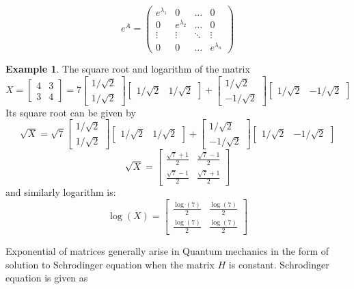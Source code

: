 \documentclass[12pt, oneside]{book}
\theoremstyle{definition}
\theoremstyle{definition}
\newtheorem{example}{Example}[section]
\theoremstyle{remark}
\begin{document}
\[ e^A = \begin{pmatrix} e^{\lambda_1} & 0 & \ldots & 0 \\ 0 & e^{\lambda_2} & \ldots & 0 \\ \vdots & \vdots & \ddots & \vdots \\ 0 & 0 & \ldots & e^{\lambda_n} \end{pmatrix} \]
\begin{example}
    The square root and logarithm of the matrix
    \[
    X=\begin{bmatrix} 4 & 3 \\ 3 & 4 \end{bmatrix}=7\begin{bmatrix} 1/\sqrt{2} \\ 1/\sqrt{2} \end{bmatrix} \begin{bmatrix} 1/\sqrt{2} & 1/\sqrt{2} \end{bmatrix} + \begin{bmatrix} 1/\sqrt{2} \\ -1/\sqrt{2} \end{bmatrix} \begin{bmatrix} 1/\sqrt{2} & -1/\sqrt{2} \end{bmatrix}
    \]
    Its square root can be given by
    \[
      \sqrt{X} = \sqrt{7}  \begin{bmatrix} 1/\sqrt{2} \\ 1/\sqrt{2} \end{bmatrix} \begin{bmatrix} 1/\sqrt{2} & 1/\sqrt{2} \end{bmatrix} + \begin{bmatrix} 1/\sqrt{2} \\ -1/\sqrt{2} \end{bmatrix} \begin{bmatrix} 1/\sqrt{2} & -1/\sqrt{2} \end{bmatrix}
    \]
    \[
    \sqrt{X}=\begin{bmatrix} \frac{\sqrt{7}+1}{2} & \frac{\sqrt{7}-1}{2} \\ \frac{\sqrt{7}-1}{2} & \frac{\sqrt{7}+1}{2} \end{bmatrix}
    \]
    and similarly logarithm is:
    \[
    \log(X)=\begin{bmatrix} \frac{\log(7)}{2} & \frac{\log(7)}{2} \\ \frac{\log(7)}{2} & \frac{\log(7)}{2} \end{bmatrix}
    \]
\end{example}
Exponential of matrices generally arise in Quantum mechanics in the form of solution to Schrodinger equation when the matrix $H$ is constant. Schrodinger equation is given as
\end{document}
